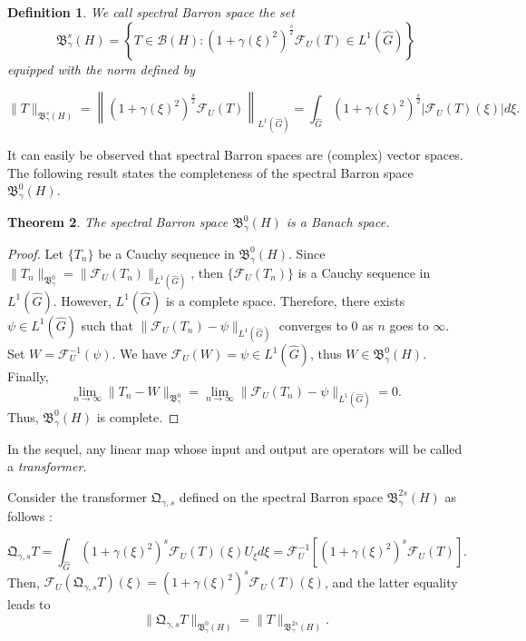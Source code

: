 \documentclass[11pt,a4paper]{amsart}
\newtheorem{theorem}{Theorem}[section]
\newtheorem{definition}[theorem]{Definition}
\begin{document}
\begin{definition}  We call spectral Barron space the set 
\begin{equation}
\mathfrak{B}^s_\gamma (H)=\left\{T\in \mathcal{B}(H): (1+\gamma(\xi)^2)^{\frac{s}{2}}\mathcal{F}_U(T)\in L^1(\widehat{G})\right\}
\end{equation}
 equipped with the  norm defined  by 

\begin{equation}
\|T\|_{\mathfrak{B}^s_\gamma (H)}=\left\|(1+\gamma(\xi)^2)^{\frac{s}{2}}\mathcal{F}_U(T)\right\|_{L^1(\widehat{G})}=\int_{\widehat{G}}(1+\gamma(\xi)^2)^{\frac{s}{2}}|\mathcal{F}_U(T)(\xi)|d\xi.
\end{equation}
\end{definition}
It can easily be observed that spectral Barron spaces are (complex) vector spaces.
The following result states the completeness of the spectral Barron space $\mathfrak{B}^0_\gamma(H)$.
\begin{theorem}\label{Banach space}
The spectral Barron space $\mathfrak{B}^0_\gamma(H)$ is a Banach space.  
\end{theorem}
\begin{proof}
Let $\{T_n\}$ be a Cauchy sequence in $\mathfrak{B}^0_\gamma(H)$. Since $\|T_n\|_{\mathfrak{B}^0_\gamma}=\|\mathcal{F}_U(T_n)\|_{L^1(\widehat{G})}$, then $\{\mathcal{F}_U(T_n)\}$ is a Cauchy sequence in $L^1(\widehat{G})$. However,    $L^1(\widehat{G})$ is a complete space. Therefore, there exists $\psi\in L^1(\widehat{G})$ such that $\|\mathcal{F}_U(T_n)-\psi\|_{L^1(\widehat{G})}$ converges to 0 as $n$ goes to $\infty$. Set $W=\mathcal{F}_U^{-1}(\psi)$. We have $\mathcal{F}_U(W)=\psi \in L^1(\widehat{G})$, thus $W\in \mathfrak{B}^0_\gamma(H)$. Finally, 
$$\lim\limits_{n\rightarrow\infty}\|T_n-W\|_{\mathfrak{B}^0_\gamma}=\lim\limits_{n\rightarrow\infty}\|\mathcal{F}_U(T_n)-\psi\|_{L^1(\widehat{G})}=0.$$
Thus, $\mathfrak{B}^0_\gamma (H)$ is complete.
\end{proof}
In the sequel, any linear map whose input and output are operators will be called a {\it transformer}.

Consider the transformer $\mathfrak{Q}_{\gamma,s}$  defined on the spectral Barron space $\mathfrak{B}^{2s}_\gamma (H)$ as follows : 
 
$$\mathfrak{Q}_{\gamma,s}T=\int_{\widehat{G}}(1+\gamma(\xi)^2)^s\mathcal{F}_U(T)(\xi)U_\xi d\xi=\mathcal{F}_U^{-1}\left[(1+\gamma(\xi)^2)^s\mathcal{F}_U(T)\right].$$
Then, $\mathcal{F}_U(\mathfrak{Q}_{\gamma,s}T)(\xi)=(1+\gamma(\xi)^2)^s\mathcal{F}_U(T)(\xi)$,
 and the latter equality  leads to 
$$\|\mathfrak{Q}_{\gamma,s}T\|_{\mathfrak{B}^0_\gamma (H)}=\|T\|_{\mathfrak{B}^{2s}_\gamma (H)}.$$ 
\end{document}
